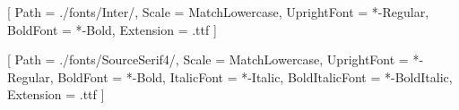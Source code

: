 \usepackage[]{fontspec}
\usepackage{titlesec}

\newcommand{\setupInterFonts}{
    \setmainfont{Inter}[
        Path = ./fonts/Inter/,
        Scale = MatchLowercase,
        UprightFont = *-Regular,
        BoldFont = *-Bold,
        Extension = .ttf
    ]
}

\newcommand{\setupSourceSansFonts}{
    \setsansfont{SourceSans3}[
        Path = ./fonts/SourceSans3/,
        Scale = MatchLowercase,
        UprightFont = *-Regular,
        BoldFont = *-Bold,
        ItalicFont = *-Italic,
        BoldItalicFont = *-BoldItalic,
        Extension = .ttf
    ]
}

\newcommand{\setupSourceSerifFonts}{
    \newfontfamily\seriffont{SourceSerif4}[
        Path = ./fonts/SourceSerif4/,
        Scale = MatchLowercase,
        UprightFont = *-Regular,
        BoldFont = *-Bold,
        ItalicFont = *-Italic,
        BoldItalicFont = *-BoldItalic,
        Extension = .ttf
    ]
}


 \newfontfamily{}[
   Path = ./fonts/Inter/,
   Scale = MatchLowercase,
   UprightFont = *-Regular,
   BoldFont = *-Bold,
   Extension = .ttf
 ]




\newfontfamily{}[
    Path = ./fonts/SourceSerif4/,
    Scale = MatchLowercase,
    UprightFont = *-Regular,
    BoldFont = *-Bold,
    ItalicFont = *-Italic,
    BoldItalicFont = *-BoldItalic,
    Extension = .ttf
]

\renewcommand{\normalsize}{\fontsize{10}{12}\selectfont\bodyfont}
\renewcommand{\large}{\fontsize{12}{14}\selectfont\bodyfont}
\renewcommand{\Large}{\fontsize{14}{18}\selectfont\bodyfont}

